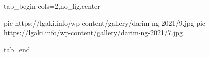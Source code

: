  
 
 
 
 

\ifcmt
  tab_begin cols=2,no_fig,center

     pic https://lgaki.info/wp-content/gallery/darim-ng-2021/9.jpg
		 pic https://lgaki.info/wp-content/gallery/darim-ng-2021/7.jpg

  tab_end
\fi
